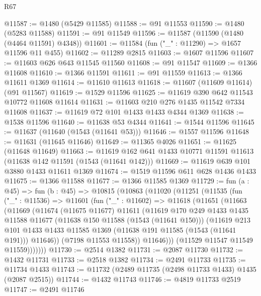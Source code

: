 \begin{lexlean}{R67}
\begin{coremodule}
@11587 := @1480 (@5429 @11585)
@11588 := @91 @11553
@11590 := @1480 (@5283 @11588)
@11591 := @91 @11549
@11596 := @11587 (@11590 (@1480 (@4464 @11591) @4348))
@11601 := @11584 (fun ("_" : @11290) => @1657 @11596 @11 @455)
@11602 := @11289 @2815
@11603 := @1607 @11596
@11607 := @11603 @626 @643 @11545 @11560
@11608 := @91 @11547
@11609 := @1366 @11608
@11610 := @1366 @11591
@11611 := @91 @11559
@11613 := @1366 @11611 @1369
@11614 := @11610 @11613
@11618 := @11607 (@11609 @11614) (@91 @11567)
@11619 := @1529 @11596
@11625 := @11619 @390 @642 @11543 @10772 @11608 @11614
@11631 := @11603 @210 @276 @1435 @11542 @7334 @11608
@11637 := @11619 @72 @101 @1433 @1433 @4344 @1369
@11638 := @1538 @11596
@11640 := @11638 @53 @4344
@11641 := @1544 @11596
@11645 := @11637 (@11640 (@1543 (@11641 @53)))
@11646 := @1557 @11596
@11648 := @11631 (@11645 @11646)
@11649 := @11365 @4026
@11651 := @11625 (@11648 @11649)
@11663 := @11619 @162 @641 @1433 @10771 @11591 @11613 (@11638 @142 @11591 (@1543 (@11641 @142)))
@11669 := @11619 @639 @101 @3880 @1433 @11611 @1369
@11674 := @1519 @11596 @611 @628 @1436 @1433
@11675 := @1366 @11588
@11677 := @1366 @11585 @1369
@11729 := fun (a : @45) =>
  fun (b : @45) =>
  @10815
    (@10863
      (@11020
        (@11251
          (@11535
            (fun ("_" : @11536) =>
            @11601
              (fun ("_" : @11602) =>
              @11618
                (@11651
                  (@11663
                    (@11669
                      (@11674
                        (@11675 @11677)
                        @11611
                        (@11619
                          @170
                          @249
                          @1433
                          @1435
                          @11588
                          @11677
                          (@11638 @150 @11588 (@1543 (@11641 @150)))
                          (@11619
                            @213
                            @101
                            @1433
                            @1433
                            @11585
                            @1369
                            (@11638 @191 @11585 (@1543 (@11641 @191)))
                            @11646))
                        (@7198 @11553 @11558))
                      @11646)))
                (@11529 @11547 @11549 @11559)))))))
@11730 := @2514 @1382
@11731 := @2087 @11730
@11732 := @1432 @11731
@11733 := @2518 @1382
@11734 := @2491 @11733
@11735 := @11734 @1433
@11743 := @11732 (@2489 @11735 (@2498 @11733 @1433) @1435 (@2087 @2515))
@11744 := @1432 @11743
@11746 := @4819 @11733 @2519
@11747 := @2491 @11746

\end{coremodule}
\end{lexlean}
